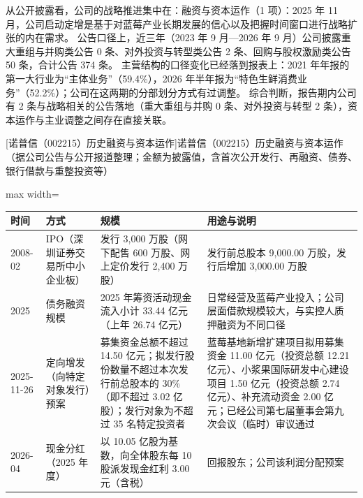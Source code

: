  从公开披露看，公司的战略推进集中在：融资与资本运作（1 项）：2025 年 11 月，公司启动定增是基于对蓝莓产业长期发展的信心以及把握时间窗口进行战略扩张的内在需求。 公告口径上，近三年（2023 年 9 月---2026 年 9 月）公司披露重大重组与并购类公告 0 条、对外投资与转型类公告 2 条、回购与股权激励类公告 50 条，合计公告 374 条。 主营结构的口径变化已经落到报表上：2021 年年报的第一大行业为“主体业务”（59.4\%），2026 年半年报为“特色生鲜消费业务”（52.2\%）；公司在这两期的分部划分方式有过调整。 综合判断，报告期内公司有 2 条与战略相关的公告落地（重大重组与并购 0 条、对外投资与转型 2 条），资本运作与主业调整之间存在直接关联。

\begin{center}\small\setlength{\tabcolsep}{4pt}
[诺普信（002215）历史融资与资本运作]{诺普信（002215）历史融资与资本运作（据公司公告与公开报道整理；金额为披露值，含首次公开发行、再融资、债券、银行借款与重整投资等）}
\begin{adjustbox}{max width=\textwidth}
\begin{tabular}{@{}p{1.45cm}p{2.55cm}p{4.05cm}p{4.95cm}@{}}
\toprule
时间 & 方式 & 规模 & 用途与说明 \\
\midrule
2008-02 & IPO（深圳证券交易所中小企业板） & 发行 3,\allowbreak{}000 万股（网下配售 600 万股、\allowbreak{}网上定价发行 2,\allowbreak{}400 万股） & 发行前总股本 9,\allowbreak{}000.00 万股，\allowbreak{}发行后增加 3,\allowbreak{}000.00 万股 \\
2025 & 债务融资规模 & 2025 年筹资活动现金流入小计 33.44 亿元（上年 26.74 亿元） & 日常经营及蓝莓产业投入；公司层面借款规模较大，\allowbreak{}与实控人质押融资为不同口径 \\
2025-11-26 & 定向增发（向特定对象发行）预案 & 募集资金总额不超过 14.50 亿元；拟发行股份数量不超过本次发行前总股本的 30\%（即不超过 3.02 亿股）；发行对象为不超过 35 名特定投资者 & 蓝莓基地新增扩建项目拟用募集资金 11.00 亿元（投资总额 12.21 亿元）、\allowbreak{}小浆果国际研发中心建设项目 1.50 亿元（投资总额 2.74 亿元）、\allowbreak{}补充流动资金 2.00 亿元；已经公司第七届董事会第九次会议（临时）审议通过 \\
2026-04 & 现金分红（2025 年度） & 以 10.05 亿股为基数，\allowbreak{}向全体股东每 10 股派发现金红利 3.00 元（含税） & 回报股东；公司该利润分配预案 \\
\bottomrule
\end{tabular}
\end{adjustbox}
\end{center}

